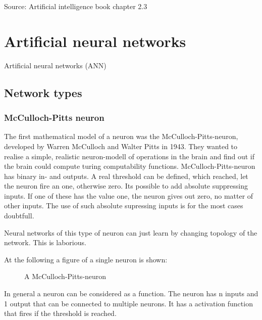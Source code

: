 \documentclass[10pt,a4paper,DIV=11]{scrreprt}
\begin{document}
Source: Artificial intelligence book chapter 2.3

\chapter{Artificial neural networks}
Artificial neural networks (ANN)

\section{Network types}


\subsection{McCulloch-Pitts neuron}
The first mathematical model of a neuron was the McCulloch-Pitts-neuron,
developed by Warren McCulloch and Walter Pitts in 1943.
They wanted to realise a simple, realistic neuron-modell of operations in the brain and find out if the brain could compute turing computability functions.
McCulloch-Pitts-neuron has binary in- and outputs.
A real threshold can be defined, which reached, let the neuron fire an one, otherwise zero.
Its possible to add absolute suppressing inputs. If one of these has the value one, the neuron gives out zero, no matter of other inputs. The use of such absolute supressing inputs is for the most cases doubtfull.


Neural networks of this type of neuron can just learn by changing topology of the network. This is laborious.

At the following a figure of a single neuron is shown:

\begin{figure}[H]  %
	\centering
	\caption{A McCulloch-Pitts-neuron}
	\label{fig:pitts1}
\end{figure}

In general a neuron can be considered as a function.
The neuron has n inputs and 1 output that can be connected to multiple neurons. It has a activation function that fires if the threshold is reached.
\end{document}
